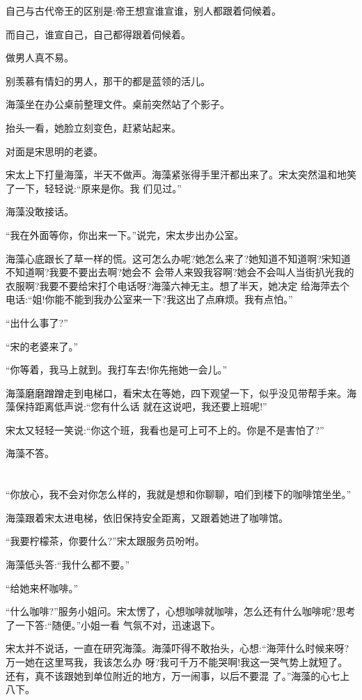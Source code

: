 \documentclass[11pt,a4paper,onecolumn]{article}
\begin{document}
自己与古代帝王的区别是:帝王想宣谁宣谁，别人都跟着伺候着。

而自己，谁宣自己，自己都得跟着伺候着。

做男人真不易。

别羡慕有情妇的男人，那干的都是蓝领的活儿。

海藻坐在办公桌前整理文件。桌前突然站了个影子。

抬头一看，她脸立刻变色，赶紧站起来。

对面是宋思明的老婆。

宋太上下打量海藻，半天不做声。海藻紧张得手里汗都出来了。宋太突然温和地笑了一下，轻轻说:``原来是你。我
们见过。''

海藻没敢接话。

``我在外面等你，你出来一下。''说完，宋太步出办公室。

海藻心底跟长了草一样的慌。这可怎么办呢?她怎么来了?她知道不知道啊?宋知道不知道啊?我要不要出去啊?她会不
会带人来毁我容啊?她会不会叫人当街扒光我的衣服啊?我要不要给宋打个电话呀?海藻六神无主。想了半天，她决定
给海萍去个电话:``姐!你能不能到我办公室来一下?我这出了点麻烦。我有点怕。''

``出什么事了?''

``宋的老婆来了。''

``你等着，我马上就到。我打车去!你先拖她一会儿。''

海藻磨磨蹭蹭走到电梯口，看宋太在等她，四下观望一下，似乎没见带帮手来。海藻保持距离低声说:``您有什么话
就在这说吧，我还要上班呢!''

宋太又轻轻一笑说:``你这个班，我看也是可上可不上的。你是不是害怕了?''

海藻不答。

\section[\thesection]{}

``你放心，我不会对你怎么样的，我就是想和你聊聊，咱们到楼下的咖啡馆坐坐。''

海藻跟着宋太进电梯，依旧保持安全距离，又跟着她进了咖啡馆。

``我要柠檬茶，你要什么?''宋太跟服务员吩咐。

海藻低头答:``我什么都不要。''

``给她来杯咖啡。''

``什么咖啡?''服务小姐问。宋太愣了，心想咖啡就咖啡，怎么还有什么咖啡呢?思考了一下答:``随便。''小姐一看
气氛不对，迅速退下。

宋太并不说话，一直在研究海藻。海藻吓得不敢抬头，心想:``海萍什么时候来呀?万一她在这里骂我，我该怎么办
呀?我可千万不能哭啊!我这一哭气势上就短了。还有，真不该跟她到单位附近的地方，万一闹事，以后不要混
了。''海藻的心七上八下。
\end{document}
